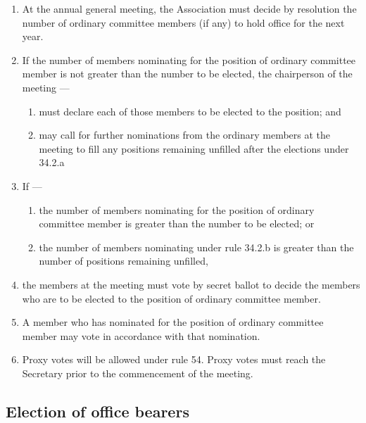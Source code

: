 \documentclass[../constitution.tex]{subfiles}
\begin{document}
\begin{enumerate}

\item At the annual general meeting, the Association must decide by resolution the number of ordinary committee members (if any) to hold office for the next year.
\item If the number of members nominating for the position of ordinary committee member is not greater than the number to be elected, the chairperson of the meeting ---

  \begin{enumerate}
  
  \item must declare each of those members to be elected to the position; and
  \item may call for further nominations from the ordinary members at the meeting to fill any positions remaining unfilled after the elections under 34.2.a
  \end{enumerate}
\item If ---

  \begin{enumerate}
  
  \item the number of members nominating for the position of ordinary committee member is greater than the number to be elected; or
  \item the number of members nominating under rule 34.2.b is greater than the number of positions remaining unfilled,
  \end{enumerate}
\item the members at the meeting must vote by secret ballot to decide the members who are to be elected to the position of ordinary committee member.
\item A member who has nominated for the position of ordinary committee member may vote in accordance with that nomination.
\item Proxy votes will be allowed under rule 54. Proxy votes must reach the Secretary prior to the commencement of the meeting.
\end{enumerate}

\hypertarget{election-of-office-bearers}{%
\subsection{Election of office bearers}\label{election-of-office-bearers}}
\end{document}
